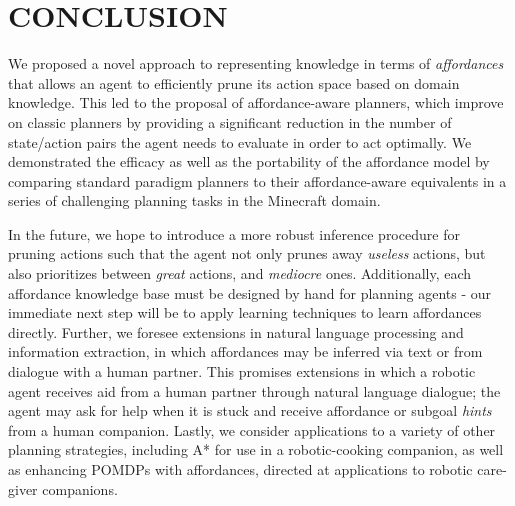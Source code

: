 \documentclass[]{article}
\begin{document}
\section{CONCLUSION}

We proposed a novel approach to representing knowledge in terms of
{\em affordances}~\citep{gibson77} that allows an agent to efficiently
prune its action space based on domain knowledge. This led to the 
proposal of affordance-aware planners, which improve on classic planners
by providing a significant reduction in the number of state/action pairs the
agent needs to evaluate in order to act optimally. We demonstrated the efficacy 
as well as the portability of the affordance model by comparing standard paradigm
planners to their affordance-aware equivalents in a series of challenging planning tasks in the Minecraft
domain.

In the future, we hope to introduce a more robust inference procedure for pruning actions such that
the agent not only prunes away {\it useless} actions, but also prioritizes between
{\it great} actions, and {\it mediocre} ones. Additionally, each affordance knowledge base
must be designed by hand for planning agents - our immediate next step will be to
apply learning techniques to learn affordances directly.
Further, we foresee extensions in natural language processing and information
extraction, in which affordances may be inferred via text or from dialogue with a human partner.
This promises extensions in which a robotic agent receives aid from a human partner through natural language
dialogue; the agent may ask for help when it is stuck and
receive affordance or subgoal {\it hints} from a human companion. Lastly, we consider applications to a variety of other planning
strategies, including A* for use in a robotic-cooking companion, as well as enhancing POMDPs with affordances, directed at applications to robotic care-giver companions.


  
\end{document}
